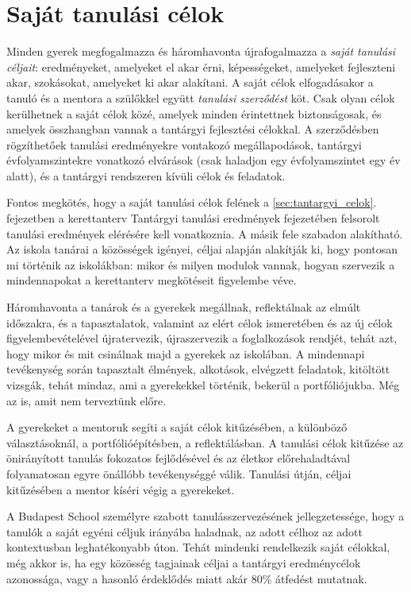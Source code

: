 \section{Saját tanulási célok}

Minden gyerek megfogalmazza és háromhavonta újrafogalmazza a \emph{saját
  tanulási céljait}: eredményeket, amelyeket el akar érni, képességeket,
amelyeket fejleszteni akar, szokásokat, amelyeket ki akar alakítani. A saját
célok elfogadásakor a tanuló és a mentora a szülőkkel együtt \emph{tanulási
  szerződést} köt. Csak olyan célok kerülhetnek a saját célok közé, amelyek
minden érintettnek biztonságosak, és amelyek összhangban vannak a tantárgyi
fejlesztési célokkal. A szerződésben rögzíthetőek tanulási eredményekre vontakozó megállapodások,
tantárgyi évfolyamszintekre vonatkozó elvárások (csak haladjon egy évfolyamszintet egy év alatt), és a tantárgyi rendszeren kívüli célok és feladatok.

Fontos megkötés, hogy a saját tanulási célok felének a 
\ifkerettanterv
\ref{sec:tantargyi_celok}. fejezetben 
\else
a kerettanterv Tantárgyi tanulási eredmények fejezetében
\fi
felsorolt tanulási eredmények elérésére kell vonatkoznia. A másik
fele szabadon alakítható. Az iskola tanárai a közösségek igényei, céljai
alapján alakítják ki, hogy pontosan mi történik az iskolákban: mikor és milyen
modulok vannak, hogyan szervezik a mindennapokat a kerettanterv megkötéseit figyelembe véve.

Háromhavonta a tanárok és a gyerekek megállnak, reflektálnak az elmúlt
időszakra, és a tapasztalatok, valamint az elért célok ismeretében és az új
célok figyelembevételével újratervezik, újraszervezik a foglalkozások rendjét,
tehát azt, hogy mikor és mit csinálnak majd a gyerekek az iskolában.
A mindennapi tevékenység során tapasztalt élmények, alkotások, elvégzett
feladatok, kitöltött vizsgák, tehát mindaz, ami a gyerekekkel történik, bekerül
a portfóliójukba. Még az is, amit nem terveztünk előre.

A gyerekeket a mentoruk segíti a saját célok kitűzésében, a különböző
választásoknál, a portfólióépítésben, a reflektálásban. A tanulási célok
kitűzése az önirányított tanulás fokozatos fejlődésével és az életkor
előrehaladtával folyamatosan egyre önállóbb tevékenységgé válik. Tanulási
útján, céljai kitűzésében a mentor kíséri végig a gyerekeket.

A Budapest School személyre szabott tanulásszervezésének jellegzetessége, hogy
a tanulók a saját egyéni céljuk irányába haladnak, az adott célhoz az adott
kontextusban leghatékonyabb úton. Tehát mindenki rendelkezik saját célokkal,
még akkor is, ha egy közösség tagjainak céljai a tantárgyi eredménycélok
azonossága, vagy a hasonló érdeklődés miatt akár  80\% átfedést mutatnak.

